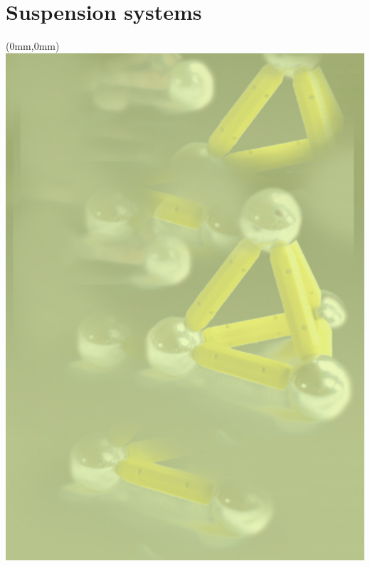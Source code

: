 \documentclass[draft,color,DIV12,pdftex,a4paper]{ET-DS}
\begin{document}
\section{Suspension systems} \label{sec:suspension_systems}

%
%
\cleardoublepage
\FloatBarrier
%
\begin{textblock*}{297mm}(0mm,0mm)   \includegraphics[width=\paperwidth]{Sec_Optics/OpticsFirstPage.jpg}
\end{textblock*}
%
\end{document}
